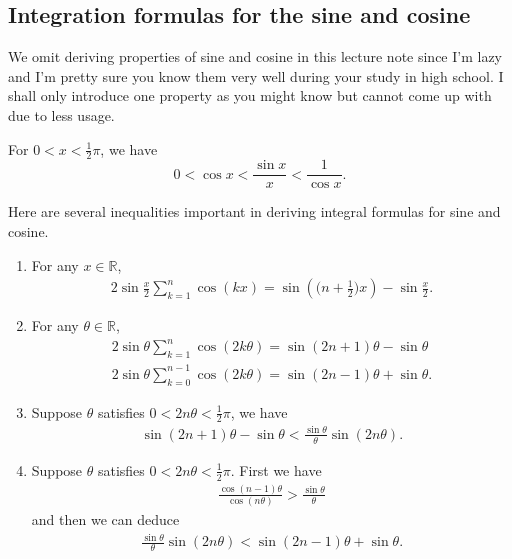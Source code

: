 \documentclass[a4paper]{ctexart}
\begin{document}
	\subsection{Integration formulas for the sine and cosine}
	We omit deriving properties of sine and cosine in this lecture note since I'm lazy and I'm pretty sure you know them very well during your study in high school. I shall only introduce one property as you might know but cannot come up with due to less usage.
	\begin{mythm}
		For $0<x<\frac{1}{2}\pi$, we have
		\[
		0<\cos x< \frac{\sin x}{x} < \frac{1}{\cos x}.
		\]
	\end{mythm}
	\begin{mypro}
		Here are several inequalities important in deriving integral formulas
		for sine and cosine.
		\begin{enumerate}
			\item For any $x\in\mathbb R$,
			\begin{align*}
				2\sin\frac{x}{2}\sum_{k=1}^{n}\cos(kx)=\sin\!\left(\Big(n+\frac12\Big)x\right)-\sin\frac{x}{2}.
			\end{align*}
			
			\item For any $\theta\in\mathbb R$,
			\begin{align*}
				2\sin\theta\sum_{k=1}^{n}\cos(2k\theta)=\sin(2n+1)\theta-\sin\theta
				\\
				2\sin\theta\sum_{k=0}^{n-1}\cos(2k\theta)=\sin(2n-1)\theta+\sin\theta.
			\end{align*}
			
			\item Suppose $\theta$ satisfies $0<2n\theta<\tfrac12\pi$, we have
			\begin{align*}
				\sin(2n+1)\theta-\sin\theta<\frac{\sin\theta}{\theta}\sin(2n\theta).
			\end{align*}
			
			\item Suppose $\theta$ satisfies $0<2n\theta<\tfrac12\pi$. First we have
			\begin{align*}
				\frac{\cos(n-1)\theta}{\cos(n\theta)}>\frac{\sin\theta}{\theta}
			\end{align*}
			and then we can deduce
			\begin{align*}
				\frac{\sin\theta}{\theta}\sin(2n\theta)<\sin(2n-1)\theta+\sin\theta.
			\end{align*}
		\end{enumerate}
	\end{mypro}
\end{document}
